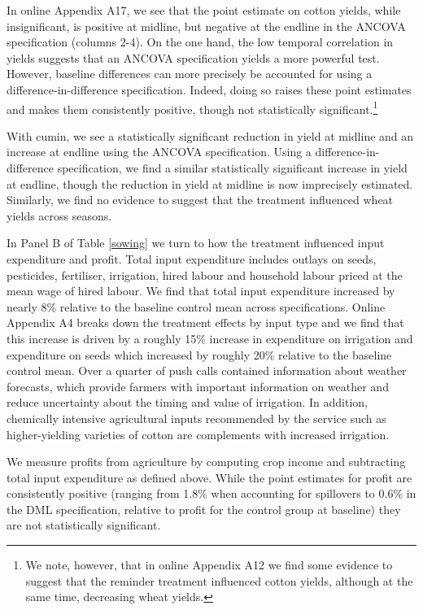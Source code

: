\documentclass[12pt]{article}
\begin{document}
{{In online Appendix A17, we see that the point estimate on cotton yields, while insignificant, is positive at midline, but negative at the endline in the ANCOVA specification (columns 2-4). On the one hand, the low temporal correlation in yields suggests that an ANCOVA specification yields a more powerful test. However, baseline differences can more precisely be accounted for using a difference-in-difference specification. Indeed, doing so raises these point estimates and makes them consistently positive, though not statistically significant.\footnote{We note, however, that in online Appendix A12 we find some evidence to suggest that the reminder treatment influenced cotton yields, although at the same time, decreasing wheat yields.}  

With cumin, we see a statistically significant reduction in yield at midline and an increase at endline using the ANCOVA specification. Using a difference-in-difference specification, we find a similar statistically significant increase in yield at endline, though the reduction in yield at midline is now imprecisely estimated. Similarly, we find no evidence to suggest that the treatment influenced wheat yields across seasons. }

 In Panel B of Table \ref{sowing} we turn to how the treatment influenced input expenditure and profit. Total input expenditure includes outlays on seeds, pesticides, fertiliser, irrigation, hired labour and household labour priced at the mean wage of hired labour. We find that total input expenditure increased by nearly 8\% relative to the baseline control mean across specifications. Online Appendix A4 breaks down the treatment effects by input type and we find that this increase is driven by a roughly 15\% increase in expenditure on irrigation and expenditure on seeds which increased by roughly 20\% relative to the baseline control mean. Over a quarter of push calls contained information about weather forecasts, which provide farmers with important information on weather and reduce uncertainty about the timing and
value of irrigation. In addition, chemically intensive agricultural inputs
recommended by the service such as higher-yielding varieties of cotton are complements with increased irrigation.

We measure profits from agriculture by computing crop income and subtracting total input expenditure as defined above. While the point estimates for profit are consistently positive (ranging from 1.8\% when accounting for spillovers to 0.6\% in the DML specification, relative to profit for the control group at baseline) they are not statistically significant.  

}
\end{document}

